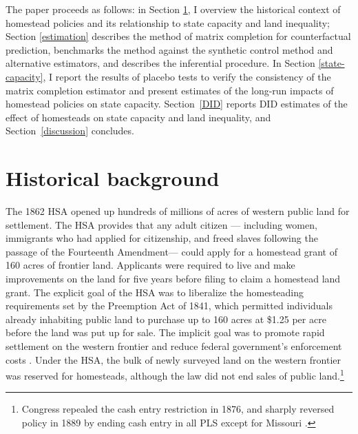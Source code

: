 \documentclass[12pt]{article}
\begin{document}
The paper proceeds as follows: in Section \ref{history}, I overview the historical context of homestead policies and its relationship to state capacity and land inequality; Section \ref{estimation} describes the method of matrix completion for counterfactual prediction, benchmarks the method against the synthetic control method and alternative estimators, and describes the inferential procedure. In Section \ref{state-capacity}, I report the results of placebo tests to verify the consistency of the matrix completion estimator and present estimates of the long-run impacts of homestead policies on state capacity. Section~\ref{DID} reports DID estimates of the effect of homesteads on state capacity and land inequality, and Section~\ref{discussion} concludes. 

\setcounter{section}{1} %
\section{Historical background} \label{history}

The 1862 HSA opened up hundreds of millions of acres of western public land for settlement. The HSA provides that any adult citizen --- including women, immigrants who had applied for citizenship, and freed slaves following the passage of the Fourteenth Amendment---  could apply for a homestead grant of 160 acres of frontier land. Applicants were required to live and make improvements on the land for five years before filing to claim a homestead land grant. The explicit goal of the HSA was to liberalize the homesteading requirements set by the Preemption Act of 1841, which permitted individuals already inhabiting public land to purchase up to 160 acres at \$1.25 per acre before the land was put up for sale. The implicit goal was to promote rapid settlement on the western frontier and reduce federal government's enforcement costs \citep{allen1991homesteading}. Under the HSA, the bulk of newly surveyed land on the western frontier was reserved for homesteads, although the law did not end sales of public land.\footnote{Congress repealed the cash entry restriction in 1876, and sharply reversed policy in 1889 by ending cash entry in all PLS except for Missouri \citep{gates1940federal}.}
\end{document}
